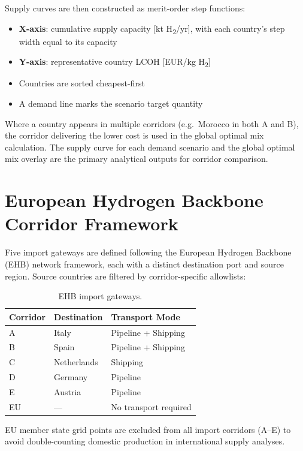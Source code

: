 Supply curves are then constructed as merit-order step functions:
\begin{itemize}
    \item \textbf{X-axis}: cumulative supply capacity [kt H\textsubscript{2}/yr], with each country's step width equal to its capacity
    \item \textbf{Y-axis}: representative country LCOH [EUR/kg H\textsubscript{2}]
    \item Countries are sorted cheapest-first
    \item A demand line marks the scenario target quantity
\end{itemize}

Where a country appears in multiple corridors (e.g.\ Morocco in both A and B), the corridor delivering the lower cost is used in the global optimal mix calculation. The supply curve for each demand scenario and the global optimal mix overlay are the primary analytical outputs for corridor comparison.

\section{European Hydrogen Backbone Corridor Framework}
\label{sec:corridors}

Five import gateways are defined following the European Hydrogen Backbone (EHB) network framework, each with a distinct destination port and source region. Source countries are filtered by corridor-specific allowlists:

\begin{table}[htbp]
    \centering
    \caption{EHB import gateways.}
    \label{tab:corridors}
    \small
    \begin{tabular}{p{2.5cm}p{2cm}p{4cm}}
        \toprule
        Corridor & Destination & Transport Mode \\
        \midrule
        A & Italy & Pipeline + Shipping \\
        B & Spain & Pipeline + Shipping \\
        C & Netherlands & Shipping \\
        D & Germany & Pipeline \\
        E & Austria & Pipeline \\
        EU & --- & No transport required \\
        \bottomrule
    \end{tabular}
\end{table}

EU member state grid points are excluded from all import corridors (A--E) to avoid double-counting domestic production in international supply analyses.

